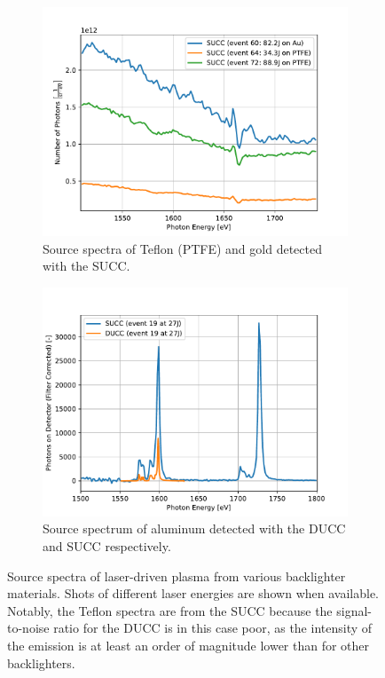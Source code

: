\begin{figure} [H]
\begin{subfigure}[t]{0.49\textwidth}
		\includegraphics[width=\textwidth]{Data_Analysis/basic_spectra/spectra_of_PTFE_events_60_64_72.pdf}
		\caption{Source spectra of Teflon (PTFE) and gold detected with the SUCC.}
		\label{subfigure: PTFE basic spectra}
	\end{subfigure}%
	\hfill
	\begin{subfigure}[t]{0.49\textwidth}
		\centering
		\includegraphics[width=\textwidth]{Data_Analysis/basic_spectra/spectra_of_Al_events_19_19.pdf}
		\caption{Source spectrum of aluminum detected with the DUCC and SUCC respectively.}
		\label{fig: Al DUCC series}
	\end{subfigure}
	\caption{Source spectra of laser-driven plasma from various backlighter materials. Shots of different laser energies are shown when available. Notably, the Teflon spectra are from the SUCC because the signal-to-noise ratio for the DUCC is in this case poor, as the intensity of the emission is at least an order of magnitude lower than for other backlighters.}
	\label{figure: basic spectra}
\end{figure}

